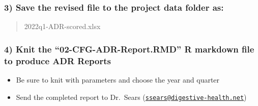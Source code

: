 \documentclass[
]{article}
\providecommand{\tightlist}{%
  \setlength{\itemsep}{0pt}\setlength{\parskip}{0pt}}
\begin{document}
\hypertarget{save-the-revised-file-to-the-project-data-folder-as}{%
\subsubsection{3) Save the revised file to the project data folder
as:}\label{save-the-revised-file-to-the-project-data-folder-as}}

\begin{quote}
2022q1-ADR-scored.xlsx
\end{quote}

\hypertarget{knit-the-02-cfg-adr-report.rmd-r-markdown-file-to-produce-adr-reports}{%
\subsubsection{4) Knit the ``02-CFG-ADR-Report.RMD'' R markdown file to
produce ADR
Reports}\label{knit-the-02-cfg-adr-report.rmd-r-markdown-file-to-produce-adr-reports}}

\begin{itemize}
\tightlist
\item
  Be sure to knit with parameters and choose the year and quarter
\item
  Send the completed report to Dr.~Sears
  (\href{mailto:ssears@digestive-health.net}{\nolinkurl{ssears@digestive-health.net}})
\end{itemize}
\end{document}
